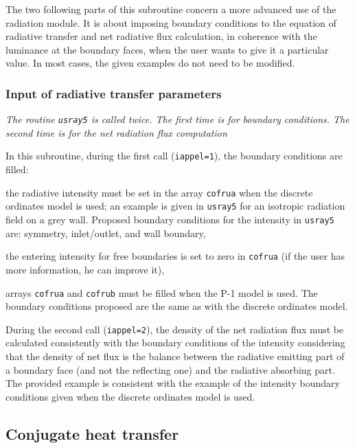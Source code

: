 {{{\noindent
The two following parts of this subroutine concern a more advanced use
of the radiation module. It is about imposing boundary conditions to the
equation of radiative transfer and net radiative flux calculation, in
coherence with the luminance at the boundary faces, when the user wants
to give it a particular value. In most cases, the given examples do not
need to be modified.

\subsubsection{Input of radiative transfer parameters}

\noindent
\textit{The routine \texttt{usray5} is called twice. The first time is for boundary
conditions. The second time is for the net radiation flux computation}

In this subroutine, during the first call (\texttt{iappel=1}), the boundary conditions
 are filled:
\begin{list}{-}{}
\item the radiative intensity must be set in the array \texttt{cofrua} when the discrete
 ordinates model is used; an example is given in \texttt{usray5} for an isotropic radiation
 field on a grey wall. Proposed boundary conditions for the intensity in \texttt{usray5} are:
symmetry, inlet/outlet, and wall boundary,
\item the entering intensity for free boundaries is set to zero in \texttt{cofrua} (if the
user has more information, he can improve it),
\item arrays \texttt{cofrua} and \texttt{cofrub} must be filled when the P-1 model is
 used. The boundary conditions proposed are the same as with the discrete ordinates model.
\end{list}
During the second call (\texttt{iappel=2}), the density of the net radiation flux must be
 calculated consistently with the boundary conditions of the intensity considering that the
density of net flux is the balance between the radiative emitting part of a boundary face
(and not the reflecting one) and the radiative absorbing part. The provided example is
consistent with the example of the intensity boundary conditions given when the discrete
 ordinates model is used.


\subsection{Conjugate heat transfer}
}}}
